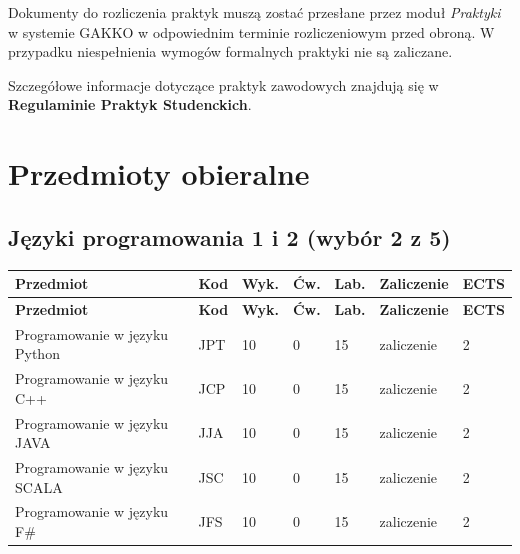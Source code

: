 \documentclass[12pt,a4paper]{article}
\newcommand{\thdrule}{\noalign{\global\setlength{\extrarowheight}{0pt}}}
\newcommand{\thdend}{\noalign{\global\setlength{\extrarowheight}{4pt}}}
\begin{document}
Dokumenty do rozliczenia praktyk muszą zostać przesłane przez moduł \textit{Praktyki} w systemie GAKKO w odpowiednim terminie rozliczeniowym przed obroną. W przypadku niespełnienia wymogów formalnych praktyki nie są zaliczane.

Szczegółowe informacje dotyczące praktyk zawodowych znajdują się w \textbf{Regulaminie Praktyk Studenckich}.

\newpage

\section{Przedmioty obieralne}


\subsection*{Języki programowania 1 i 2 (wybór 2 z 5)}

{\scriptsize
\begin{longtable}{m{5.5cm}m{0.8cm}m{1cm}m{1cm}m{1cm}m{1.7cm}m{0.7cm}}
\thdrule\toprule
\rowcolor{pjatkRed}
{\color{white}\footnotesize\textbf{\vphantom{Ag}Przedmiot}} & {\color{white}\footnotesize\textbf{\vphantom{Ag}Kod}} & {\color{white}\footnotesize\textbf{\vphantom{Ag}Wyk.}} & {\color{white}\footnotesize\textbf{\vphantom{Ag}Ćw.}} & {\color{white}\footnotesize\textbf{\vphantom{Ag}Lab.}} & {\color{white}\footnotesize\textbf{\vphantom{Ag}Zaliczenie}} & {\color{white}\footnotesize\textbf{\vphantom{Ag}ECTS}} \\
\midrule\thdend
\endfirsthead
\thdrule\toprule
\rowcolor{pjatkRed}
{\color{white}\footnotesize\textbf{\vphantom{Ag}Przedmiot}} & {\color{white}\footnotesize\textbf{\vphantom{Ag}Kod}} & {\color{white}\footnotesize\textbf{\vphantom{Ag}Wyk.}} & {\color{white}\footnotesize\textbf{\vphantom{Ag}Ćw.}} & {\color{white}\footnotesize\textbf{\vphantom{Ag}Lab.}} & {\color{white}\footnotesize\textbf{\vphantom{Ag}Zaliczenie}} & {\color{white}\footnotesize\textbf{\vphantom{Ag}ECTS}} \\
\midrule\thdend
\endhead
\rowcolor{tableRowLight} Programowanie w języku Python & JPT & 10 & 0 & 15 & {\scriptsize zaliczenie} & 2 \\
\rowcolor{tableRowAlt} Programowanie w języku C++ & JCP & 10 & 0 & 15 & {\scriptsize zaliczenie} & 2 \\
\rowcolor{tableRowLight} Programowanie w języku JAVA & JJA & 10 & 0 & 15 & {\scriptsize zaliczenie} & 2 \\
\rowcolor{tableRowAlt} Programowanie w języku SCALA & JSC & 10 & 0 & 15 & {\scriptsize zaliczenie} & 2 \\
\rowcolor{tableRowLight} Programowanie w języku F\# & JFS & 10 & 0 & 15 & {\scriptsize zaliczenie} & 2 \\
\bottomrule
\end{longtable}}
\end{document}
